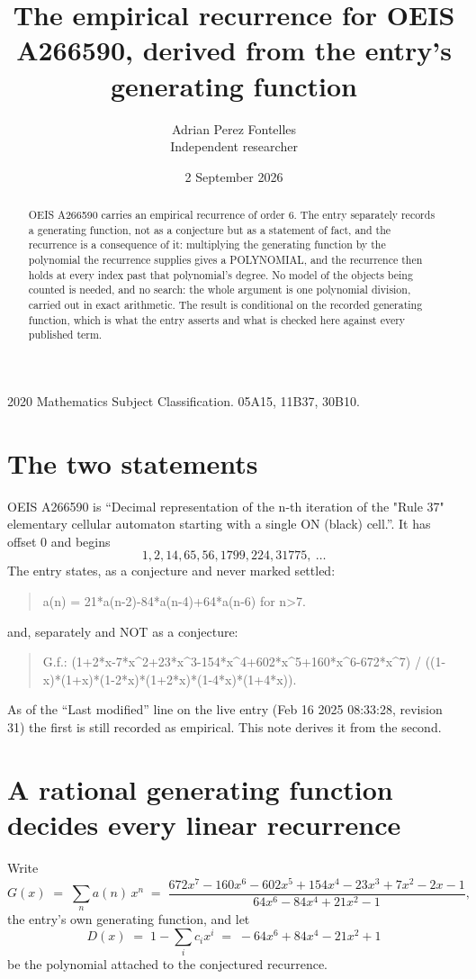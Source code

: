 \documentclass[11pt,a4paper]{article}
\title{The empirical recurrence for OEIS A266590, derived from the entry's generating function}
\author{Adrian Perez Fontelles\\ \small Independent researcher}
\date{2 September 2026}
\theoremstyle{plain}
\theoremstyle{definition}
\begin{document}
\maketitle

\begin{abstract}
OEIS A266590 carries an empirical recurrence of order $6$. The entry separately records a
generating function, not as a conjecture but as a statement of fact, and the recurrence is a
consequence of it: multiplying the generating function by the polynomial the recurrence
supplies gives a POLYNOMIAL, and the recurrence then holds at every index past that
polynomial's degree. No model of the objects being counted is needed, and no search: the
whole argument is one polynomial division, carried out in exact arithmetic. The result is
conditional on the recorded generating function, which is what the entry asserts and what is
checked here against every published term.
\end{abstract}

\noindent\small 2020 Mathematics Subject Classification. 05A15, 11B37, 30B10.\normalsize

\section{The two statements}

OEIS A266590 is ``Decimal representation of the n-th iteration of the "Rule 37" elementary cellular automaton starting with a single ON (black) cell.''. It has offset $0$ and begins
\[
1, 2, 14, 65, 56, 1799, 224, 31775,\ \dots
\]
The entry states, as a conjecture and never marked settled:
\begin{quote}
a(n) = 21*a(n-2)-84*a(n-4)+64*a(n-6) for n>7.
\end{quote}
and, separately and NOT as a conjecture:
\begin{quote}
G.f.: (1+2*x-7*x\^{}2+23*x\^{}3-154*x\^{}4+602*x\^{}5+160*x\^{}6-672*x\^{}7) / ((1-x)*(1+x)*(1-2*x)*(1+2*x)*(1-4*x)*(1+4*x)).
\end{quote}
As of the ``Last modified'' line on the live entry (Feb 16 2025 08:33:28, revision 31) the first is still
recorded as empirical. This note derives it from the second.

\section{A rational generating function decides every linear recurrence}

Write
\[
G(x)\;=\;\sum_{n}a(n)\,x^{n}\;=\;\frac{672 x^{7} - 160 x^{6} - 602 x^{5} + 154 x^{4} - 23 x^{3} + 7 x^{2} - 2 x - 1}{64 x^{6} - 84 x^{4} + 21 x^{2} - 1},
\]
the entry's own generating function, and let
\[
D(x)\;=\;1-\sum_i c_i x^{i}\;=\;- 64 x^{6} + 84 x^{4} - 21 x^{2} + 1
\]
be the polynomial attached to the conjectured recurrence.
\end{document}
